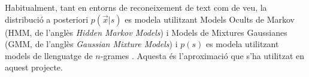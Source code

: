 Habitualment, tant en entorns de reconeixement de text com de veu, la distribució a posteriori $p(\vec{x}|s)$ es modela utilitzant Models Ocults de Markov (HMM, de l'anglès \emph{Hidden Markov Models}) i Models de Mixtures Gaussianes (GMM, de l'anglès \emph{Gaussian Mixture Models}) \cite{huanghidden, jelinek1998statistical, ghahramani2001introduction} i $p(s)$ es modela utilitzant models de llenguatge de $n$-grames \cite{jelinek1998statistical,katz1987estimation,marti2001using}. Aquesta és l'aproximació que s'ha utilitzat en aquest projecte.